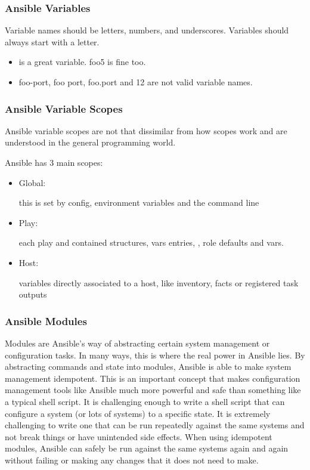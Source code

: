 \documentclass[BTech]{srmuthesis}
\begin{document}
\subsubsection{Ansible Variables}

Variable names should be letters, numbers, and underscores. Variables should always start with a letter.

\begin{itemize}
    \item {} is a great variable. foo5 is fine too.
    \item foo-port, foo port, foo.port and 12 are not valid variable names.
\end{itemize}

\subsubsection{Ansible Variable Scopes}

Ansible variable scopes are not that dissimilar from how scopes work and are understood in the general programming world.

Ansible has 3 main scopes:

\begin{itemize}
    \item Global: \par this is set by config, environment variables and the command line
    \item Play: \par each play and contained structures, vars entries, , role defaults and vars.
    \item Host: \par variables directly associated to a host, like inventory, facts or registered task outputs

\end{itemize}

\subsubsection{Ansible Modules}

Modules are Ansible’s way of abstracting certain system management or configuration tasks. In many ways, this is where the real power in Ansible lies. By abstracting commands and state into modules, Ansible is able to make system management idempotent. This is an important concept that makes configuration management tools like Ansible much more powerful and safe than something like a typical shell script. It is challenging enough to write a shell script that can configure a system (or lots of systems) to a specific state. It is extremely challenging to write one that can be run repeatedly against the same systems and not break things or have unintended side effects. When using idempotent modules, Ansible can safely be run against the same systems again and again without failing or making any changes that it does not need to make.
\end{document}
